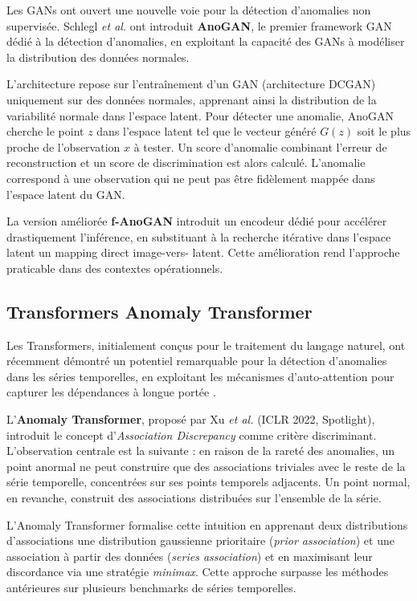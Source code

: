 \documentclass[12pt, a4paper]{article}
\begin{document}
Les GANs ont ouvert une nouvelle voie pour la détection d'anomalies non
supervisée. Schlegl \textit{et al.} \cite{schlegl2017unsupervised} ont
introduit \textbf{AnoGAN}, le premier framework GAN dédié à la détection
d'anomalies, en exploitant la capacité des GANs à modéliser la distribution
des données normales.

L'architecture repose sur l'entraînement d'un GAN (architecture DCGAN)
uniquement sur des données normales, apprenant ainsi la distribution de
la variabilité normale dans l'espace latent. Pour détecter une anomalie,
AnoGAN cherche le point $z$ dans l'espace latent tel que le vecteur généré
$G(z)$ soit le plus proche de l'observation $x$ à tester. Un score d'anomalie
combinant l'erreur de reconstruction et un score de discrimination est alors
calculé. L'anomalie correspond à une observation qui ne peut pas être
fidèlement mappée dans l'espace latent du GAN.

La version améliorée \textbf{f-AnoGAN} \cite{schlegl2019fanogan} introduit
un encodeur dédié pour accélérer drastiquement l'inférence, en substituant
à la recherche itérative dans l'espace latent un mapping direct image-vers-
latent. Cette amélioration rend l'approche praticable dans des contextes
opérationnels.

\subsection{Transformers  Anomaly Transformer}

Les Transformers, initialement conçus pour le traitement du langage naturel,
ont récemment démontré un potentiel remarquable pour la détection d'anomalies
dans les séries temporelles, en exploitant les mécanismes d'auto-attention
pour capturer les dépendances à longue portée \cite{mamba2025}.

L'\textbf{Anomaly Transformer}, proposé par Xu \textit{et al.}
\cite{xu2022anomaly} (ICLR 2022, Spotlight), introduit le concept
d'\textit{Association Discrepancy} comme critère discriminant. L'observation
centrale est la suivante : en raison de la rareté des anomalies, un point
anormal ne peut construire que des associations triviales avec le reste de la
série temporelle, concentrées sur ses points temporels adjacents. Un point
normal, en revanche, construit des associations distribuées sur l'ensemble
de la série.

L'Anomaly Transformer formalise cette intuition en apprenant deux
distributions d'associations  une distribution gaussienne prioritaire
(\textit{prior association}) et une association à partir des données
(\textit{series association})  et en maximisant leur discordance via
une stratégie \textit{minimax}. Cette approche surpasse les méthodes
antérieures sur plusieurs benchmarks de séries temporelles.
\end{document}
